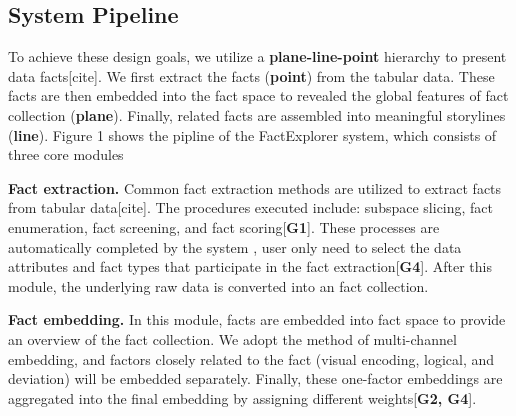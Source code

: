 \subsection{System Pipeline} 
To achieve these design goals, we utilize a \textbf{plane-line-point} hierarchy to present data facts[cite]. We first extract the facts (\textbf{point}) from the tabular data. These facts are then embedded into the fact space to revealed the global features of fact collection (\textbf{plane}). Finally, related facts are assembled into meaningful storylines (\textbf{line}). Figure 1 shows the pipline of the FactExplorer system, which consists of three core modules

\textbf{Fact extraction.} Common fact extraction methods are utilized to extract facts from tabular data[cite]. The procedures executed include: subspace slicing, fact enumeration, fact screening, and fact scoring[\textbf{G1}]. These processes are automatically completed by the system , user only need to select the data attributes and fact types that participate in the fact extraction[\textbf{G4}]. After this module, the underlying raw data is converted into an fact collection.

\textbf{Fact embedding.} In this module, facts are embedded into fact space to provide an overview of the fact collection. We adopt the method of multi-channel embedding, and factors closely related to the fact (visual encoding, logical, and deviation) will be embedded separately. Finally, these one-factor embeddings are aggregated into the final embedding by assigning different weights[\textbf{G2, G4}].

